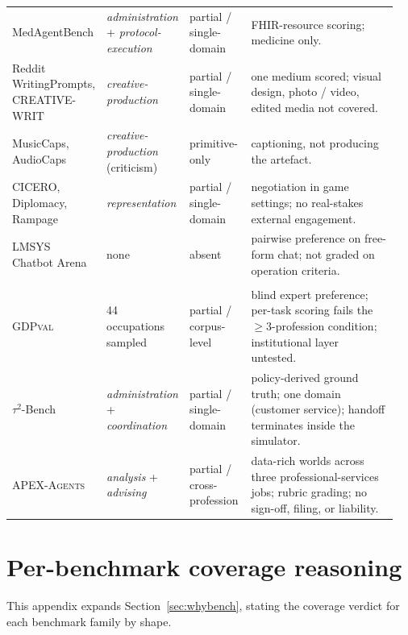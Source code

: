 \documentclass{article}
\begin{document}
\begin{table}[!htbp]
\begin{tabular}{p{0.21\linewidth} p{0.18\linewidth} p{0.16\linewidth} p{0.40\linewidth}}
MedAgentBench                       & \emph{administration} + \emph{protocol-execution} & partial / single-domain & FHIR-resource scoring; medicine only. \\
Reddit WritingPrompts, CREATIVE-WRIT & \emph{creative-production}      & partial / single-domain & one medium scored; visual design, photo / video, edited media not covered. \\
MusicCaps, AudioCaps                & \emph{creative-production} (criticism) & primitive-only    & captioning, not producing the artefact. \\
CICERO, Diplomacy, Rampage          & \emph{representation}             & partial / single-domain & negotiation in game settings; no real-stakes external engagement. \\
LMSYS Chatbot Arena                 & none                                & absent                  & pairwise preference on free-form chat; not graded on operation criteria. \\
\addlinespace[2pt]
\multicolumn{4}{l}{\textit{Audited in detail in Section~\ref{sec:whybench}.}} \\
\textsc{GDPval}                     & 44 occupations sampled              & partial / corpus-level  & blind expert preference; per-task scoring fails the $\geq\!3$-profession condition; institutional layer untested. \\
$\tau^2$-Bench                      & \emph{administration} + \emph{coordination} & partial / single-domain & policy-derived ground truth; one domain (customer service); handoff terminates inside the simulator. \\
\textsc{APEX-Agents}                & \emph{analysis} + \emph{advising} & partial / cross-profession & data-rich worlds across three professional-services jobs; rubric grading; no sign-off, filing, or liability. \\
\bottomrule
\end{tabular}
\end{table}

\section{Per-benchmark coverage reasoning}
\label{app:perbench}

This appendix expands Section~\ref{sec:whybench}, stating the coverage verdict for each benchmark family by shape.
\end{document}

